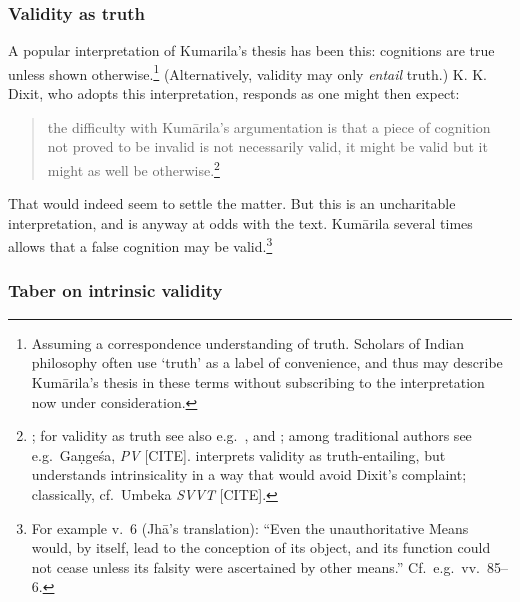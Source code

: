 ﻿\documentclass[11pt]{amsart}
\begin{document}
\subsubsection*{Validity as truth}

A popular interpretation of Kumarila's thesis has been this: cognitions are true unless shown otherwise.\footnote{Assuming a correspondence understanding of truth. Scholars of Indian philosophy often use `truth' as a label of convenience, and thus may describe Kum\=arila's thesis in these terms without subscribing to the interpretation now under consideration.}  (Alternatively, validity may only \emph{entail} truth.) K. K. Dixit, who adopts this interpretation, responds as one might then expect:\small\begin{quote}the difficulty with Kum\=arila's argumentation is that a piece of cognition not proved to be invalid is not necessarily valid, it might be valid but it might as well be otherwise.\footnote{\citet[p.~5]{dixit1983slokavarttika}; for validity as truth see also e.g.~\citet{chatterjea2003svatah}, and \citet{hiriyanna1932outlines}; among traditional authors see e.g.~Ga\d nge\'sa, \emph{PV} [CITE]. \citet{bhatt1962epistemology} interprets validity as truth-entailing, but understands intrinsicality in a way that would avoid Dixit's complaint; classically, cf.~Umbeka \emph{SVVT} [CITE].} \end{quote}\normalsize That would indeed seem to settle the matter. But this is an uncharitable interpretation, and is anyway at odds with the text. Kum\=arila several times allows that a false cognition may be valid.\footnote{For example v.~6 (Jh\=a's translation): ``Even the unauthoritative Means would, by itself, lead to the conception of its object, and its function could not cease unless its falsity were ascertained by other means.'' Cf.~e.g.~vv.~85--6.}

\subsubsection*{Taber on intrinsic validity}
\end{document}

